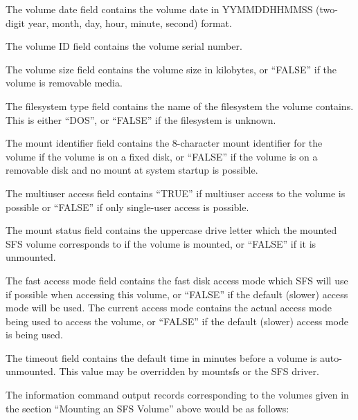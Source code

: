 The volume date field contains the volume date in YYMMDDHHMMSS (two-digit year,
month, day, hour, minute, second) format.

The volume ID field contains the volume serial number.

The volume size field contains the volume size in kilobytes, or ``FALSE'' if the
volume is removable media.

The filesystem type field contains the name of the filesystem the volume
contains.  This is either ``DOS'', or ``FALSE'' if the filesystem is unknown.

The mount identifier field contains the 8-character mount identifier for the 
volume if the volume is on a fixed disk, or ``FALSE'' if the volume is on a 
removable disk and no mount at system startup is possible.

The multiuser access field contains ``TRUE'' if multiuser access to the volume is
possible or ``FALSE'' if only single-user access is possible.

The mount status field contains the uppercase drive letter which the mounted
SFS volume corresponds to if the volume is mounted, or ``FALSE'' if it is
unmounted.

The fast access mode field contains the fast disk access mode which SFS will
use if possible when accessing this volume, or ``FALSE'' if the default (slower)
access mode will be used.  The current access mode contains the actual access
mode being used to access the volume, or ``FALSE'' if the default (slower) access
mode is being used.

The timeout field contains the default time in minutes before a volume is
auto-unmounted.  This value may be overridden by mountsfs or the SFS driver.

The information command output records corresponding to the volumes given in 
the section ``Mounting an SFS Volume'' above would be as follows:

